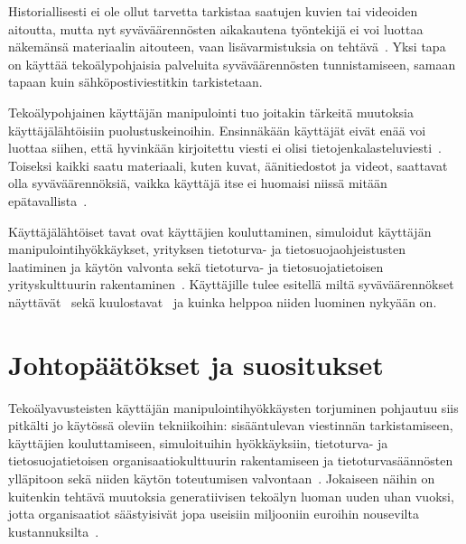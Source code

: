 \begin{otherlanguage}{finnish}
Historiallisesti ei ole ollut tarvetta tarkistaa saatujen kuvien tai videoiden aitoutta, mutta nyt syväväärennösten aikakautena työntekijä ei voi luottaa näkemänsä materiaalin aitouteen, vaan lisävarmistuksia on tehtävä~\citep{mirsky_Creation_Detection_Deepfakes_2021}. Yksi tapa on käyttää tekoälypohjaisia palveluita syväväärennösten tunnistamiseen, samaan tapaan kuin sähköpostiviestitkin tarkistetaan.


Tekoälypohjainen käyttäjän manipulointi tuo joitakin tärkeitä muutoksia käyttäjälähtöisiin puolustuskeinoihin. Ensinnäkään käyttäjät eivät enää voi luottaa siihen, että hyvinkään kirjoitettu viesti ei olisi tietojenkalasteluviesti~\citep{gupta_From_ChatGPT_to_ThreatGPT_2023}. Toiseksi kaikki saatu materiaali, kuten kuvat, äänitiedostot ja videot, saattavat olla syväväärennöksiä, vaikka käyttäjä itse ei huomaisi niissä mitään epätavallista~\citep{blauth_AI_Crime_Overview_Malicious_Use_Abuse_2022}.



Käyttäjälähtöiset tavat ovat käyttäjien kouluttaminen, simuloidut käyttäjän manipulointihyökkäykset, yrityksen tietoturva- ja tietosuojaohjeistusten laatiminen ja käytön valvonta sekä tietoturva- ja tietosuojatietoisen yrityskulttuurin rakentaminen~\citep{tsinganos_Towards_Automated_Recognition_Chat_SE_Enterprise_2018}. Käyttäjille tulee esitellä miltä syväväärennökset näyttävät~\citep{mirsky_Creation_Detection_Deepfakes_2021} sekä kuulostavat~\citep{doan_BTSE_Audio_Deepfake_Detection_2023} ja kuinka helppoa niiden luominen nykyään on.




\section*{Johtopäätökset ja suositukset}

Tekoälyavusteisten käyttäjän manipulointihyökkäysten torjuminen pohjautuu siis pitkälti jo käytössä oleviin tekniikoihin: sisääntulevan viestinnän tarkistamiseen, käyttäjien kouluttamiseen, simuloituihin hyökkäyksiin, tietoturva- ja tietosuojatietoisen organisaatiokulttuurin rakentamiseen ja tietoturvasäännösten ylläpitoon sekä niiden käytön toteutumisen valvontaan~\citep{fakhouri_AI_Driven_Solutions_SE_Attacks_2024}. Jokaiseen näihin on kuitenkin tehtävä muutoksia generatiivisen tekoälyn luoman uuden uhan vuoksi, jotta organisaatiot säästyisivät jopa useisiin miljooniin euroihin nousevilta kustannuksilta~\citep{eniza_Threat_Landscape_2024, verizon_Data_Breach_Investigations_Report_2024}.


\end{otherlanguage}
